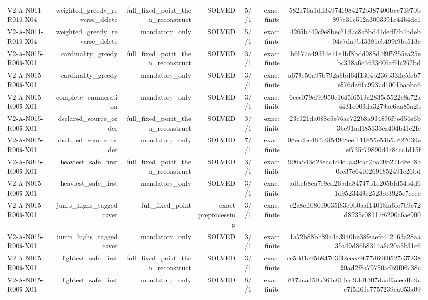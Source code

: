 {\begin{longtable}{lrrrrrr}
V2-A-N011-R010-X04 & weighted\_greedy\_reverse\_delete & full\_fixed\_point\_then\_reconstruct & SOLVED & 5//1 & exact finite & 582d76a1dd349741984272b387400bce73970b897e31c512a3003391c44b4dc1 \\
V2-A-N011-R010-X04 & weighted\_greedy\_reverse\_delete & mandatory\_only & SOLVED & 5//1 & exact finite & 4265b749c9e8bec71d7c8a8bd41dedf7b4bdeb04a7da7b13381cb499f9be513c \\
V2-A-N015-R006-X01 & cardinality\_greedy & full\_fixed\_point\_then\_reconstruct & SOLVED & 3//1 & exact finite & b6577a49334e71e4bf8bdd988d4f9f5255ea25ebc338a6c4d33d06aff4c262bd \\
V2-A-N015-R006-X01 & cardinality\_greedy & mandatory\_only & SOLVED & 3//1 & exact finite & a679e50a97b792a9bd64f1304b236b33ffe5feb7e576da66c9937d1001babba6 \\
V2-A-N015-R006-X01 & complete\_enumeration & mandatory\_only & SOLVED & 3//1 & exact finite & 6ccc079ef90950c1645f6519a2835e5522e8a72a4431e000da3279ae6aa85a2b \\
V2-A-N015-R006-X01 & declared\_source\_order & full\_fixed\_point\_then\_reconstruct & SOLVED & 3//1 & exact finite & 23c021da088c5e76ac722b8a934896f7ed54e6b3bc91ad185333ca404b41c2fc \\
V2-A-N015-R006-X01 & declared\_source\_order & mandatory\_only & SOLVED & 7//1 & exact finite & 08ec2bc46ffa9f54948eef111855e53b5a822039eef735c79890d478ccc1d15f \\
V2-A-N015-R006-X01 & heaviest\_safe\_first & full\_fixed\_point\_then\_reconstruct & SOLVED & 3//1 & exact finite & 996a543d28ecc1d4c1aa9cac2ba20b221d8e1850ce37c64102691852491c26bd \\
V2-A-N015-R006-X01 & heaviest\_safe\_first & mandatory\_only & SOLVED & 3//1 & exact finite & adbcb8ca7e9cd26bda84747b1e205bfd54b4d61d9523449c2523ce3925e7ccee \\
V2-A-N015-R006-X01 & jump\_highs\_tagged\_cover & full\_fixed\_point & exact preprocessing & 3//1 & exact finite & e2a8cff08009035f83c0b0aaf14018fa6fe7b9c72d8235c08117f6200c6ae900 \\
V2-A-N015-R006-X01 & jump\_highs\_tagged\_cover & mandatory\_only & SOLVED & 3//1 & exact finite & 1a72b88bb89a4a3940be38feaefc412163a28aa35a49d86b8314a8c20a5b31c6 \\
V2-A-N015-R006-X01 & lightest\_safe\_first & full\_fixed\_point\_then\_reconstruct & SOLVED & 3//1 & exact finite & cc5dd1e95b84703f92eecc9677d6960527e3723890ad2f8a79750adb9f06738c \\
V2-A-N015-R006-X01 & lightest\_safe\_first & mandatory\_only & SOLVED & 8//1 & exact finite & 817dca450b361c604cd9dd1307daaffacecdfa9ce7f5ff60c7757239ea053a09 \\

\end{longtable}}
